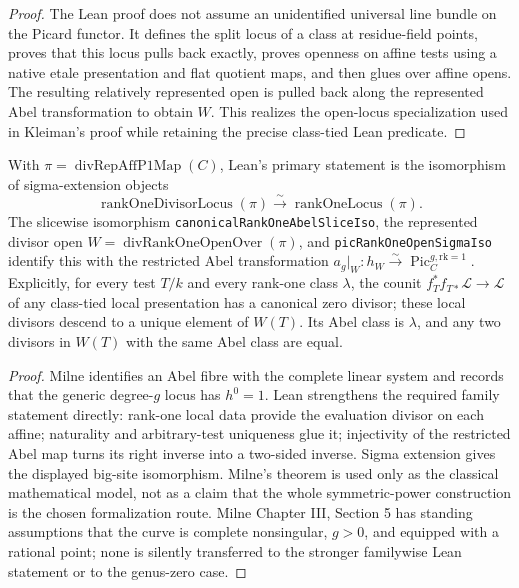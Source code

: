 \begin{proof}
  The Lean proof does not assume an unidentified universal line bundle on the
  Picard functor.  It defines the split locus of a class at residue-field
  points, proves that this locus pulls back exactly, proves openness on affine
  tests using a native etale presentation and flat quotient maps, and then
  glues over affine opens.  The resulting relatively represented open is
  pulled back along the represented Abel transformation to obtain \(W\).
  This realizes the open-locus specialization used in Kleiman's proof while
  retaining the precise class-tied Lean predicate.
\end{proof}

\begin{theorem}
  \label{route-thm-rank-one-abel-iso}
  \leanok

  With \(\pi=\operatorname{divRepAffP1Map}(C)\), Lean's primary statement is
  the isomorphism of sigma-extension objects
  \[
    \operatorname{rankOneDivisorLocus}(\pi)
      \xrightarrow{\sim}\operatorname{rankOneLocus}(\pi).
  \]
  The slicewise isomorphism
  \texttt{canonicalRankOneAbelSliceIso}, the represented divisor open
  \(W=\operatorname{divRankOneOpenOver}(\pi)\), and
  \texttt{picRankOneOpenSigmaIso} identify this with the restricted Abel
  transformation
  \(a_g|_W:h_W\xrightarrow{\sim}
  \operatorname{Pic}^{g,\mathrm{rk}=1}_C\).
  Explicitly, for every test \(T/k\) and every rank-one class \(\lambda\),
  the counit
  \(f_T^*f_{T*}\mathcal L\to\mathcal L\) of any class-tied local
  presentation has a canonical zero divisor; these local divisors descend to
  a unique element of \(W(T)\).  Its Abel class is \(\lambda\), and any two
  divisors in \(W(T)\) with the same Abel class are equal.
\end{theorem}

\begin{proof}
  Milne identifies an Abel fibre with the complete linear system and records
  that the generic degree-\(g\) locus has \(h^0=1\).  Lean strengthens the
  required family statement directly: rank-one local data provide the
  evaluation divisor on each affine; naturality and arbitrary-test uniqueness
  glue it; injectivity of the restricted Abel map turns its right inverse into
  a two-sided inverse.  Sigma extension gives the displayed big-site
  isomorphism.  Milne's theorem is used only as the classical mathematical
  model, not as a claim that the whole symmetric-power construction is the
  chosen formalization route.  Milne Chapter III, Section 5 has standing
  assumptions that the curve is complete nonsingular, \(g>0\), and equipped
  with a rational point; none is silently transferred to the stronger
  familywise Lean statement or to the genus-zero case.
\end{proof}
